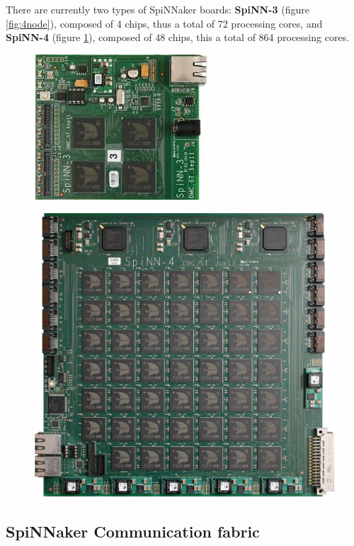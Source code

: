 There are currently two types of SpiNNaker boards: \textbf{SpiNN-3} (figure \ref{fig:4node}), composed of 4 chips, thus a total of 72 processing cores, and \textbf{SpiNN-4} (figure \ref{fig:48node}), composed of 48 chips, this a total of 864 processing cores.

\begin{figure}
\centering
\begin{minipage}{.5\textwidth}
  \centering
  \includegraphics[width=0.4\linewidth, natwidth=245, natheight=205]{images/4node.jpg}
  \label{fig:4node}
\end{minipage}%
\begin{minipage}{.5\textwidth}
  \centering
  \includegraphics[width=0.9\linewidth, natwidth=945, natheight=896]{images/48node.jpg}
  \label{fig:48node}
\end{minipage}
\end{figure}

\subsection{SpiNNaker Communication fabric}


